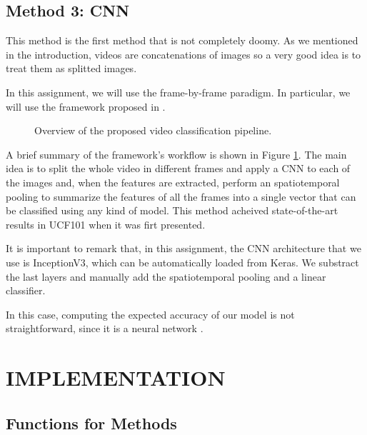 \documentclass[letterpaper, 10 pt, conference]{ieeeconf}
\begin{document}
\subsection{Method 3: CNN}

This method is the first method that is not completely doomy. As we mentioned in the introduction, videos are concatenations of images so a very good idea is to treat them as splitted images. 

In this assignment, we will use the frame-by-frame paradigm. In particular, we will use the framework proposed in \cite{CNN}. 


\begin{figure}[H]
\small
\centering
\hspace{-0.4in}
\resizebox{0.85\linewidth}{!}{%

}
\caption{Overview of the proposed video classification pipeline.}
\label{fig:overview}
\end{figure}

A brief summary of the framework's workflow is shown in Figure \ref{fig:overview}. The main idea is to split the whole video in different frames and apply a CNN to each of the images and, when the features are extracted, perform an spatiotemporal pooling to summarize the features of all the frames into a single vector that can be classified using any kind of model. This method acheived state-of-the-art results in UCF101 when it was firt presented.

It is important to remark that, in this assignment, the CNN architecture that we use is InceptionV3, which can be automatically loaded from Keras. We substract the last layers and manually add the spatiotemporal pooling and a linear classifier.

In this case, computing the expected accuracy of our model is not straightforward, since it is a neural network \cite{UNCERTAINTY}.


\section{IMPLEMENTATION}
\label{section:implementation}
\subsection{Functions for Methods}
\end{document}
